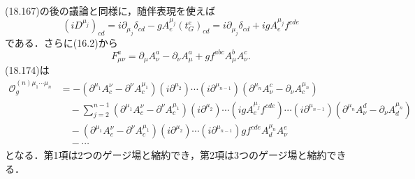 (18.167)の後の議論と同様に，随伴表現を使えば
\[
(iD^{\mu_j})_{cd} = i\partial_{\mu_j} \delta_{cd} - g A_e^{\mu_j} (t_G^e)_{cd}
= i\partial_{\mu_j} \delta_{cd} + i g A_e^{\mu_j} f^{cde}
\]
である．さらに(16.2)から
\[ F_{\mu\nu}^a = \partial_\mu A^a_\nu - \partial_\nu A^a_\mu + g f^{abc} A^b_\mu A^c_\nu . \]
(18.174)は
  \begin{align*}
    \mathcal{O}_g^{(n)\mu_1\cdots\mu_n}
    &= - (\partial^{\mu_1}A^\nu_c - \partial^\nu A^{\mu_1}_c)
    (i\partial^{\mu_2}) \cdots (i\partial^{\mu_{n-1}}) (\partial^{\mu_n}A_\nu^c - \partial_\nu A^{\mu_n}_c) \\
    &\quad - \sum_{j=2}^{n-1} (\partial^{\mu_1}A^\nu_c - \partial^\nu A^{\mu_1}_c)
    (i\partial^{\mu_2}) \cdots (i g A_e^{\mu_j} f^{cde}) \cdots (i\partial^{\mu_{n-1}}) (\partial^{\mu_n}A_\nu^d - \partial_\nu A^{\mu_n}_d) \\
    &\quad - (\partial^{\mu_1}A^\nu_c - \partial^\nu A^{\mu_1}_c)
    (i\partial^{\mu_2}) \cdots (i\partial^{\mu_{n-1}}) g f^{cde} A^{\mu_n}_d A_\nu^e \\
    &\quad - \cdots
\end{align*}
となる．第1項は2つのゲージ場と縮約でき，第2項は3つのゲージ場と縮約できる．


